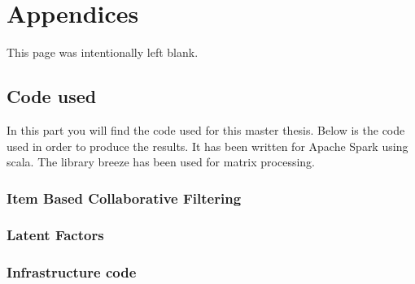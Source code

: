 \newpage
\appendix
\part{Appendices}
\newpage
\begin{center}
	This page was intentionally left blank.
\end{center}
\newpage
\chapter{Code used}
In this part you will find the code used for this master thesis.
Below is the code used in order to produce the results. It has been 
written for Apache Spark \cite{ApacheSpark:1} using scala. The library breeze has been used for matrix processing.
\clearpage
\section{Item Based Collaborative Filtering}

\clearpage
\section{Latent Factors}

\clearpage
\section{Infrastructure code}


